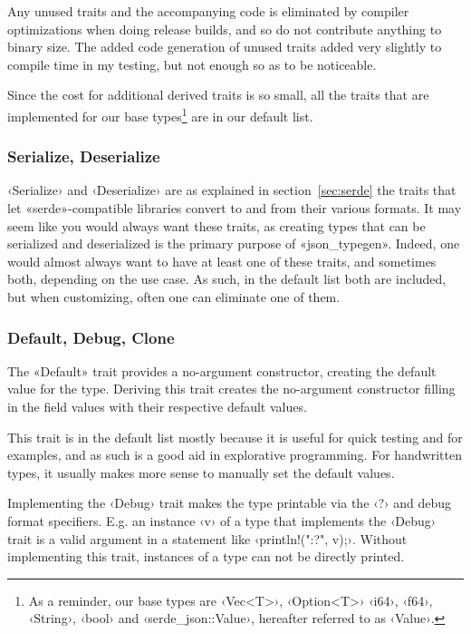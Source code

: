 Any unused traits and the accompanying code is eliminated by compiler optimizations when doing release builds, and so do not contribute anything to binary size. The added code generation of unused traits added very slightly to compile time in my testing, but not enough so as to be noticeable.

Since the cost for additional derived traits is so small, all the traits that are implemented for our base types\footnote{As a reminder, our base types are ‹Vec<T>›, ‹Option<T>› ‹i64›, ‹f64›, ‹String›, ‹bool› and ‹serde_json::Value›, hereafter referred to as ‹Value›.} are in our default list.

\subsubsection{Serialize, Deserialize}

‹Serialize› and ‹Deserialize› are as explained in section~\ref{sec:serde} the traits that let «serde»-compatible libraries convert to and from their various formats. It may seem like you would always want these traits, as creating types that can be serialized and deserialized is the primary purpose of «json_typegen». Indeed, one would almost always want to have at least one of these traits, and sometimes both, depending on the use case. As such, in the default list both are included, but when customizing, often one can eliminate one of them. %


\subsubsection{Default, Debug, Clone}

The «Default» trait provides a no-argument constructor, creating the default value for the type. Deriving this trait creates the no-argument constructor filling in the field values with their respective default values.

This trait is in the default list mostly because it is useful for quick testing and for examples, and as such is a good aid in explorative programming. For handwritten types, it usually makes more sense to manually set the default values.

Implementing the ‹Debug› trait makes the type printable via the ‹?› and  debug format specifiers. E.g. an instance ‹v› of a type that implements the ‹Debug› trait is a valid argument in a statement like ‹println!("{:?}", v);›. Without implementing this trait, instances of a type can not be directly printed.


